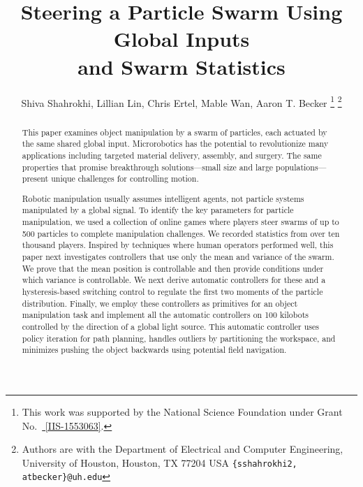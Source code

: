 \documentclass[conference]{IEEEtran}
\title{\LARGE \bf Steering a Particle Swarm Using Global Inputs\\ and Swarm Statistics}
\author{Shiva Shahrokhi, Lillian Lin, Chris Ertel, Mable Wan,  Aaron T. Becker%
\thanks{This work was supported by the National Science Foundation under Grant No.\ \href{http://nsf.gov/awardsearch/showAward?AWD_ID=1553063}{ [IIS-1553063]}.}%
\thanks{Authors are with the Department of Electrical and Computer Engineering,  University of Houston, Houston, TX 77204 USA        {\tt\small  \{sshahrokhi2, atbecker\}@uh.edu}}
}
\begin{document}
\maketitle
\thispagestyle{empty}
\pagestyle{empty}
\begin{abstract}
This paper examines object manipulation by a swarm of particles, each actuated by the same shared global input.
Microrobotics has the potential to revolutionize many applications including targeted material delivery, assembly, and surgery.  The same properties that promise breakthrough solutions---small size and large populations---present unique challenges for controlling motion. 

Robotic manipulation usually assumes intelligent agents, not particle systems manipulated by a global signal.
To identify the key parameters for particle manipulation, we used
a collection of online games where players steer swarms of up to 500 particles to complete manipulation challenges. We recorded statistics from over ten thousand players. %
 Inspired by techniques where human operators performed well, this paper next investigates controllers that use only the mean and variance of the swarm. We prove that the mean position is controllable and then provide conditions under which variance is controllable.  We next derive automatic controllers for these and a hysteresis-based switching control to regulate the first two moments of the particle distribution. 
 Finally, we employ these controllers as primitives for an object manipulation task and implement all the automatic controllers on 100 kilobots controlled by the direction of a global light source.
 This automatic controller uses policy iteration for path planning, handles outliers by partitioning the workspace, and minimizes pushing the object backwards using potential field navigation.
\end{abstract}

\end{document}
